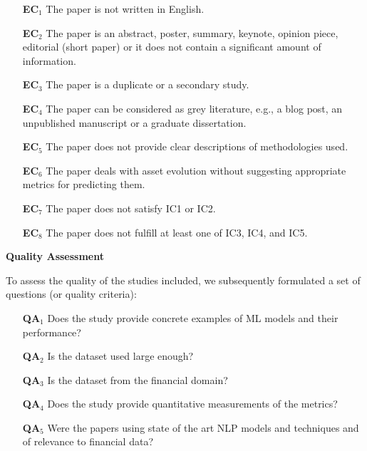 \documentclass[11pt]{article}
\begin{document}
\begin{enumerate} \label{T:exclusionCriteria}

\item[\textbf{{EC}$_1$}]
The  paper  is  not  written  in  English. \label{Word:EC1} \\
\item[\textbf{{EC}$_2$}]
The paper is an abstract, poster, summary, keynote, opinion piece, editorial (short paper) or it does not contain a significant amount of information. \label{Word:EC2} \\
\item[\textbf{{EC}$_3$}]
The paper is a duplicate or a secondary study. \label{Word:EC3} \\

\item[\textbf{{EC}$_4$}]
The  paper  can be considered as grey  literature,  e.g., a blog post, an unpublished manuscript or a graduate  dissertation.\label{Word:EC4} \\
\item[\textbf{{EC}$_5$}]
The paper does not provide clear descriptions of methodologies used.\label{Word:EC5} \\
\item[\textbf{{EC}$_6$}]
The paper deals with asset evolution without suggesting  appropriate metrics for predicting them. \label{Word:EC6} \\
\item[\textbf{{EC}$_7$}]
The paper does not satisfy IC1 or IC2. \label{Word:EC7} \\
\item[\textbf{{EC}$_8$}]
The paper does not fulfill at least one of IC3, IC4, and IC5. \label{Word:EC8} \\

\end{enumerate}

\textbf{Quality Assessment}\label{S:qualityAssessment}

To assess the quality of the studies included, we subsequently formulated a set of questions (or quality criteria):

\begin{enumerate}
    \item[\textbf{QA$_1$}] Does the study provide concrete examples of ML models and their performance? \label{Word:QA1}
    \item[\textbf{QA$_2$}] Is the dataset used large enough? \label{Word:QA2}
    \item[\textbf{QA$_3$}] Is the dataset from the financial domain? \label{Word:QA3}
    \item[\textbf{QA$_4$}]  Does the study provide quantitative measurements of the metrics? \label{Word:QA4}
    \item[\textbf{QA$_5$}]  Were the papers using state of the art NLP models and techniques and of relevance to financial data? \label{Word:QA5}
\end{enumerate}
\end{document}
